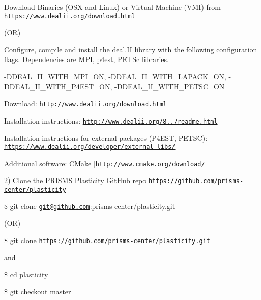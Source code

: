 \begin{DoxyItemize}
\item Download Binaries (O\-S\-X and Linux) or Virtual Machine (V\-M\-I) from \href{https://www.dealii.org/download.html}{\tt https\-://www.\-dealii.\-org/download.\-html} \par
 (O\-R) \par

\item Configure, compile and install the deal.\-I\-I library with the following configuration flags. Dependencies are M\-P\-I, p4est, P\-E\-T\-Sc libraries.\par
 -\/\-D\-D\-E\-A\-L\-\_\-\-I\-I\-\_\-\-W\-I\-T\-H\-\_\-\-M\-P\-I=O\-N, -\/\-D\-D\-E\-A\-L\-\_\-\-I\-I\-\_\-\-W\-I\-T\-H\-\_\-\-L\-A\-P\-A\-C\-K=O\-N, -\/\-D\-D\-E\-A\-L\-\_\-\-I\-I\-\_\-\-W\-I\-T\-H\-\_\-\-P4\-E\-S\-T=O\-N, -\/\-D\-D\-E\-A\-L\-\_\-\-I\-I\-\_\-\-W\-I\-T\-H\-\_\-\-P\-E\-T\-S\-C=O\-N

Download\-: \href{http://www.dealii.org/download.html}{\tt http\-://www.\-dealii.\-org/download.\-html} \par
 Installation instructions\-: \href{http://www.dealii.org/8.4.1/readme.html}{\tt http\-://www.\-dealii.\-org/8../readme.\-html} \par
 Installation instructions for external packages (P4\-E\-S\-T, P\-E\-T\-S\-C)\-: \href{https://www.dealii.org/developer/external-libs/}{\tt https\-://www.\-dealii.\-org/developer/external-\/libs/} \par

\item Additional software\-: C\-Make \mbox{[}\href{http://www.cmake.org/download/}{\tt http\-://www.\-cmake.\-org/download/}\mbox{]}
\end{DoxyItemize}

2) Clone the P\-R\-I\-S\-M\-S Plasticity Git\-Hub repo \href{https://github.com/prisms-center/plasticity}{\tt https\-://github.\-com/prisms-\/center/plasticity}\par

\begin{DoxyItemize}
\item \$ git clone \href{mailto:git@github.com}{\tt git@github.\-com}\-:prisms-\/center/plasticity.\-git \par
 (O\-R) \par

\item \$ git clone \href{https://github.com/prisms-center/plasticity.git}{\tt https\-://github.\-com/prisms-\/center/plasticity.\-git} \par
 and \par

\item \$ cd plasticity \par

\item \$ git checkout master \par

\end{DoxyItemize}

